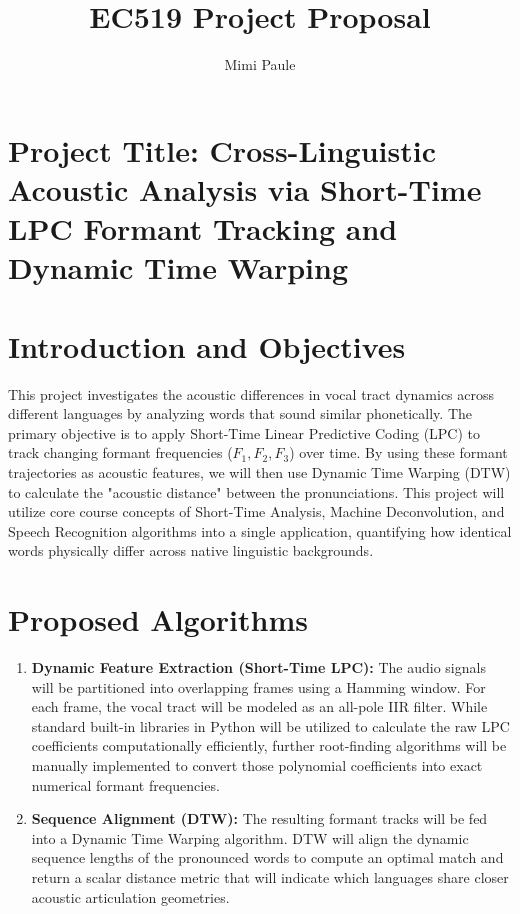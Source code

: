 \documentclass[11pt, letterpaper]{article}
\title{\vspace{-2cm}\textbf{EC519 Project Proposal}}
\author{Mimi Paule}
\date{}
\begin{document}
\maketitle
\thispagestyle{empty} %
\vspace{-1cm}

\section*{Project Title: Cross-Linguistic Acoustic Analysis via Short-Time LPC Formant Tracking and Dynamic Time Warping}
\vspace{0.3cm}
\section{Introduction and Objectives}
This project investigates the acoustic differences in vocal tract dynamics across different languages by analyzing words that sound similar phonetically. 
The primary objective is to apply Short-Time Linear Predictive Coding (LPC) to track changing formant frequencies ($F_1, F_2, F_3$) over time. 
By using these formant trajectories as acoustic features, we will then use Dynamic Time Warping (DTW) to calculate the "acoustic distance" between the pronunciations. 
This project will utilize core course concepts of Short-Time Analysis, Machine Deconvolution, and Speech Recognition algorithms into a single application, quantifying how identical words physically differ across native linguistic backgrounds.

\section{Proposed Algorithms}
\begin{enumerate}[noitemsep,topsep=0pt]
    \item \textbf{Dynamic Feature Extraction (Short-Time LPC):} The audio signals will be partitioned into overlapping frames using a Hamming window. 
    For each frame, the vocal tract will be modeled as an all-pole IIR filter. 
    While standard built-in libraries in Python will be utilized to calculate the raw LPC coefficients computationally efficiently, further root-finding algorithms will be manually implemented to convert those polynomial coefficients into exact numerical formant frequencies.
    \item \textbf{Sequence Alignment (DTW):} The resulting formant tracks will be fed into a Dynamic Time Warping algorithm. DTW will align the dynamic sequence lengths of the pronounced words to compute an optimal match and return a scalar distance metric that will indicate which languages share closer acoustic articulation geometries.
\end{enumerate}
\end{document}
